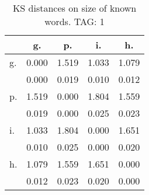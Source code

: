 \begin{table}[h!]
\begin{center}
\begin{tabular}{| l | c | c | c | c |}\hline
 & g. & p. & i. & h. \\\hline
g. & 0.000  & 1.519  & 1.033  & 1.079 \\\hline
 & 0.000  & 0.019  & 0.010  & 0.012 \\\hline
p. & 1.519  & 0.000  & 1.804  & 1.559 \\\hline
 & 0.019  & 0.000  & 0.025  & 0.023 \\\hline
i. & 1.033  & 1.804  & 0.000  & 1.651 \\\hline
 & 0.010  & 0.025  & 0.000  & 0.020 \\\hline
h. & 1.079  & 1.559  & 1.651  & 0.000 \\\hline
 & 0.012  & 0.023  & 0.020  & 0.000 \\\hline
\end{tabular}
\caption{KS distances on size of known words. TAG: 1}
\end{center}
\end{table}